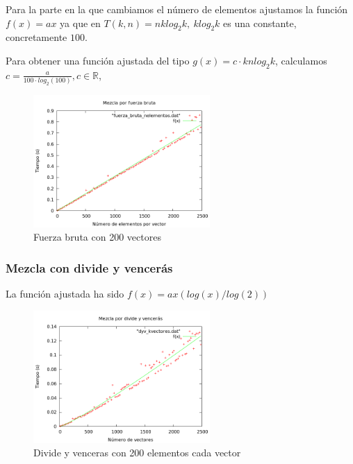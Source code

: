 \newpage
Para la parte en la que cambiamos el n\'umero de elementos ajustamos la funci\'on 
$f(x) = ax$ ya 	que en $T(k, n) = nklog_2k, \ klog_2k$ es una constante, concretamente $100$.

\begin{center}
\end{center}

Para obtener una funci\'on ajustada del tipo $g(x)=c\cdot knlog_2k$, calculamos $c=\frac{a}{100\cdot log_2(100)}, c \in \mathbb{R}$,

\begin{figure}[htb] 
\centering
	\includegraphics[width=0.6\textwidth]{../Obligatorio/Graficas/fuerza_bruta_nelementos.png}
	\caption{Fuerza bruta con 200 vectores} 
	\label{fig:f_nelementos} 
\end{figure}
\newpage


\subsubsection{Mezcla con divide y vencer\'as}
La funci\'on ajustada ha sido $f(x) = ax(log(x)/log(2))$

\begin{center}
\end{center}

\begin{figure}[htb] 
\centering
	\includegraphics[width=0.6\textwidth]{../Obligatorio/Graficas/dyv_kvectores.png}
	\caption{Divide y venceras con 200 elementos cada vector} 
	\label{fig:d_kvectores} 
\end{figure}

